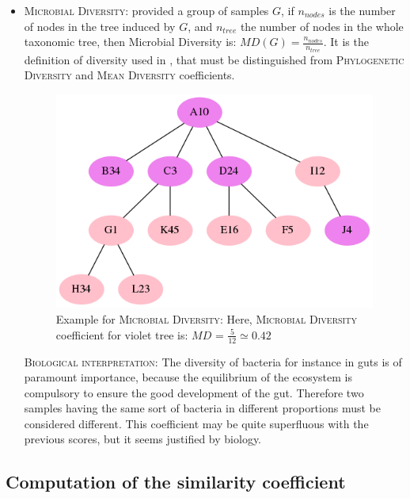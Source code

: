 \documentclass{report}
\begin{document}
\begin{itemize}
\item \textsc{Microbial Diversity:} provided a group of samples $G$, if $n_{nodes}$ is the number of nodes in the tree induced by $G$, and $n_{tree}$ the number of nodes in the whole taxonomic tree, then Microbial Diversity is: $MD(G) = \frac{n_{nodes}}{n_{tree}}$. It is the definition of diversity used in \cite{Enaud}, that must be distinguished from \textsc{Phylogenetic Diversity} \cite{PhyloD} and \textsc{Mean Diversity} \cite{MeanD} coefficients.

\begin{figure}[H]
\centering
\includegraphics[scale=0.5]{illustrations/diversity.png}
\caption{Example for \textsc{Microbial Diversity}: Here, \textsc{Microbial Diversity} coefficient for violet tree is: $MD$ = $\frac{5}{12} \simeq 0.42$}
\end{figure}

\bigskip

\textsc{Biological interpretation:} The diversity of bacteria for instance in guts is of paramount importance, because the equilibrium of the ecosystem is compulsory to ensure the good development of the gut. Therefore two samples having the same sort of bacteria in different proportions must be considered different. This coefficient may be quite superfluous with the previous scores, but it seems justified by biology.

\end{itemize}

\subsection{Computation of the similarity coefficient}
\end{document}
